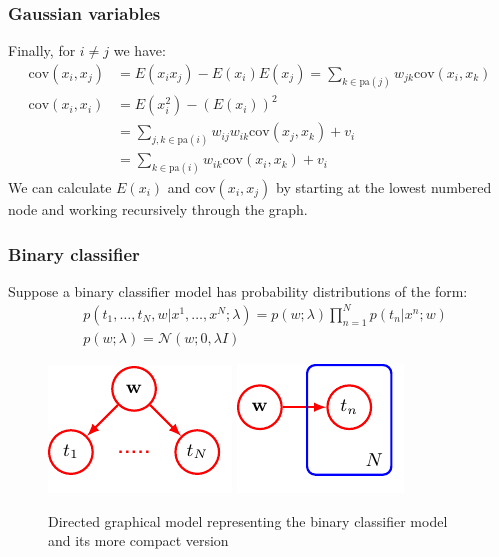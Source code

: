 \documentclass{beamer}
\begin{document}
\begin{frame}
    \frametitle{Gaussian variables}
    Finally, for $i\ne{}j$ we have:
    \begin{align*}
        \mathrm{cov}(x_{i},x_{j})&=E(x_{i}x_{j})-E(x_{i})E(x_{j})=\sum_{k\in\mathrm{pa}(j)}w_{jk}\mathrm{cov}(x_{i},x_{k}) \\
        \mathrm{cov}(x_{i},x_{i})&=E(x_{i}^{2})-(E(x_{i}))^{2} \\
        &=\sum_{j,k\in\mathrm{pa}(i)}w_{ij}w_{ik}\mathrm{cov}(x_{j},x_{k})+v_{i} \\
        &=\sum_{k\in\mathrm{pa}(i)}w_{ik}\mathrm{cov}(x_{i},x_{k})+v_{i}
    \end{align*}
    We can calculate $E(x_{i})$ and $\mathrm{cov}(x_{i},x_{j})$ by starting at the lowest numbered node and working recursively through the graph.
\end{frame}

\begin{frame}
    \frametitle{Binary classifier}
    Suppose a binary classifier model has probability distributions of the form:
    \begin{align*}
        &p(t_{1},\hdots,t_{N},w|x^{1},\hdots,x^{N};\lambda)=p(w;\lambda)\prod_{n=1}^{N}p(t_{n}|x^{n};w) \\
        &p(w;\lambda)=\mathcal{N}(w;0,\lambda{}I)
    \end{align*}
    \begin{figure}
        \caption{Directed graphical model representing the binary classifier model and its more compact version}
        \includegraphics[trim=0 0 -1cm 0]{Figure_8.pdf}
        \includegraphics[trim=-1cm 0 0 0]{Figure_9.pdf}
    \end{figure}
\end{frame}
\end{document}
